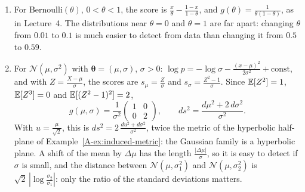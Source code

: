 \begin{example}\label{A-ex:fisher-gaussian}
    \begin{enumerate}
        \item For Bernoulli$(\theta)$, $0 < \theta < 1$, the score is $\frac{x}{\theta} - \frac{1 - x}{1 - \theta}$, and $g(\theta) = \frac{1}{\theta(1 - \theta)}$, as in Lecture~4. The distributions near $\theta = 0$ and $\theta = 1$ are far apart: changing $\theta$ from $0.01$ to $0.1$ is much easier to detect from data than changing it from $0.5$ to $0.59$.
        \item For $\mathcal{N}(\mu, \sigma^2)$ with $\boldsymbol{\theta} = (\mu, \sigma)$, $\sigma > 0$: $\log p = -\log\sigma - \frac{(x - \mu)^2}{2\sigma^2} + \text{const}$, and with $Z = \frac{X - \mu}{\sigma}$, the scores are $s_\mu = \frac{Z}{\sigma}$ and $s_\sigma = \frac{Z^2 - 1}{\sigma}$. Since $\mathbb{E}[Z^2] = 1$, $\mathbb{E}[Z^3] = 0$ and $\mathbb{E}[(Z^2 - 1)^2] = 2$,
        \[g(\mu, \sigma) = \frac{1}{\sigma^2}\begin{pmatrix} 1 & 0 \\ 0 & 2 \end{pmatrix}, \qquad ds^2 = \frac{d\mu^2 + 2\,d\sigma^2}{\sigma^2}.\]
        With $u = \frac{\mu}{\sqrt 2}$, this is $ds^2 = 2\,\frac{du^2 + d\sigma^2}{\sigma^2}$, twice the metric of the hyperbolic half-plane of Example~\ref{A-ex:induced-metric}: the Gaussian family is a hyperbolic plane. A shift of the mean by $\Delta\mu$ has the length $\frac{|\Delta\mu|}{\sigma}$, so it is easy to detect if $\sigma$ is small, and the distance between $\mathcal{N}(\mu, \sigma_1^2)$ and $\mathcal{N}(\mu, \sigma_2^2)$ is $\sqrt{2}\,|\log\frac{\sigma_2}{\sigma_1}|$: only the ratio of the standard deviations matters.
    \end{enumerate}
\end{example}

